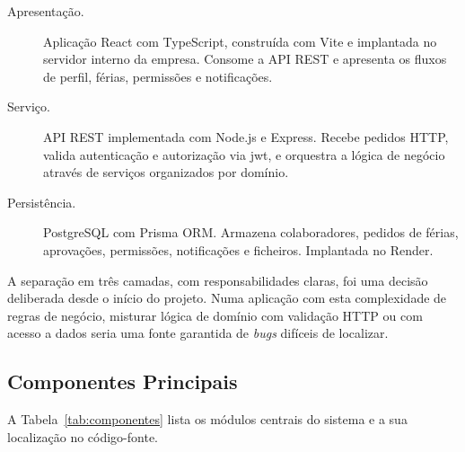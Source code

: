 \documentclass[12pt, a4paper, twoside, openright]{report}
\begin{document}
\begin{description}
  \item[Apresentação.] Aplicação React com TypeScript, construída com Vite e
        implantada no servidor interno da empresa. Consome a API REST e apresenta os fluxos de perfil,
        férias, permissões e notificações.

  \item[Serviço.] API REST implementada com Node.js e Express. Recebe pedidos HTTP,
        valida autenticação e autorização via \gls{jwt}, e orquestra a lógica de
        negócio através de serviços organizados por domínio.

  \item[Persistência.] PostgreSQL com Prisma ORM. Armazena colaboradores, pedidos
        de férias, aprovações, permissões, notificações e ficheiros. Implantada
        no Render.
\end{description}

A separação em três camadas, com responsabilidades claras, foi uma decisão deliberada
desde o início do projeto. Numa aplicação com esta complexidade de regras de negócio,
misturar lógica de domínio com validação HTTP ou com acesso a dados seria uma fonte
garantida de \textit{bugs} difíceis de localizar.

\subsection{Componentes Principais}

A Tabela~\ref{tab:componentes} lista os módulos centrais do sistema e a sua localização
no código-fonte.
\end{document}
